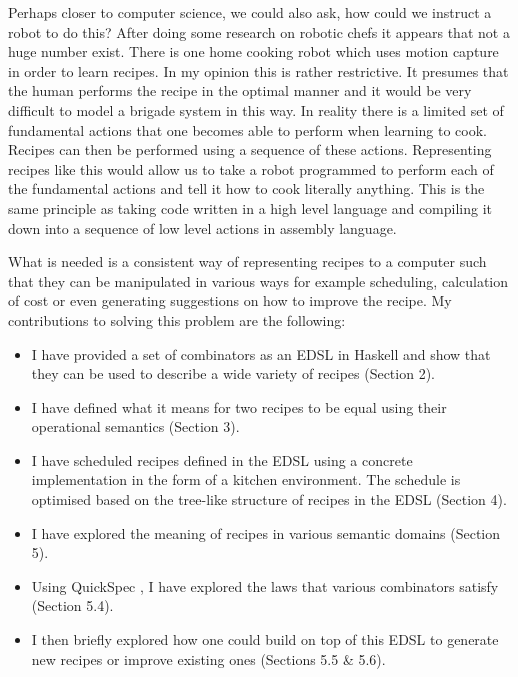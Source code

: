 \documentclass[11pt]{article}
\begin{document}
\medbreak

Perhaps closer to computer science, we could also ask, how could
we instruct a robot to do this? After doing some research on
robotic chefs it appears that not a huge number exist.
There is one home cooking robot \cite{robot} which uses motion
capture in order to learn recipes. In my opinion this is rather
restrictive. It presumes that the human performs the recipe in
the optimal manner and it would be very difficult to model
a brigade system in this way. In reality there is a limited set
of fundamental actions that one becomes able to perform when
learning to cook. Recipes can then be performed using a sequence
of these actions. Representing recipes like this would allow us
to take a robot programmed to perform each of the fundamental
actions and tell it how to cook literally anything. This is the
same principle as taking code written in a high level language
and compiling it down into a sequence of low level actions in
assembly language.

\medbreak

What is needed is a consistent way of representing recipes to
a computer such that they can be manipulated in various ways
for example scheduling, calculation of cost or even generating
suggestions on how to improve the recipe. My contributions
to solving this problem are the following:

\begin{itemize}
    \item I have provided a set of combinators as an EDSL in Haskell and show that
    they can be used to describe a wide variety of recipes (Section 2).

    \item I have defined what it means for two recipes to be equal using their
    operational semantics (Section 3).

    \item I have scheduled recipes defined in the EDSL using a concrete implementation
    in the form of a kitchen environment. The schedule is optimised based on the tree-like
    structure of recipes in the EDSL (Section 4).

    \item I have explored the meaning of recipes in various semantic domains (Section 5).

    \item Using QuickSpec \cite{quickspec, quickspec2}, I have explored the laws that
    various combinators satisfy (Section 5.4).

    \item I then briefly explored how one could build on top of this EDSL to generate
    new recipes or improve existing ones (Sections 5.5 \& 5.6).
\end{itemize}
\end{document}
